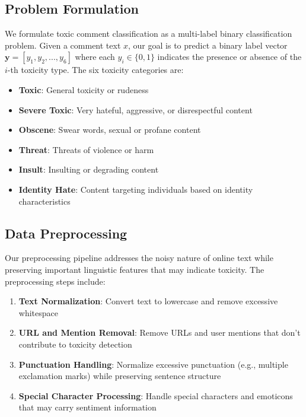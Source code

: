 \documentclass[11pt]{article}
\begin{document}
\subsection{Problem Formulation}

We formulate toxic comment classification as a multi-label binary classification problem. Given a comment text $x$, our goal is to predict a binary label vector $\mathbf{y} = [y_1, y_2, ..., y_6]$ where each $y_i \in \{0, 1\}$ indicates the presence or absence of the $i$-th toxicity type. The six toxicity categories are:

\begin{itemize}
    \item \textbf{Toxic}: General toxicity or rudeness
    \item \textbf{Severe Toxic}: Very hateful, aggressive, or disrespectful content
    \item \textbf{Obscene}: Swear words, sexual or profane content
    \item \textbf{Threat}: Threats of violence or harm
    \item \textbf{Insult}: Insulting or degrading content
    \item \textbf{Identity Hate}: Content targeting individuals based on identity characteristics
\end{itemize}

\subsection{Data Preprocessing}

Our preprocessing pipeline addresses the noisy nature of online text while preserving important linguistic features that may indicate toxicity. The preprocessing steps include:

\begin{enumerate}
    \item \textbf{Text Normalization}: Convert text to lowercase and remove excessive whitespace
    \item \textbf{URL and Mention Removal}: Remove URLs and user mentions that don't contribute to toxicity detection
    \item \textbf{Punctuation Handling}: Normalize excessive punctuation (e.g., multiple exclamation marks) while preserving sentence structure
    \item \textbf{Special Character Processing}: Handle special characters and emoticons that may carry sentiment information
\end{enumerate}
\end{document}
